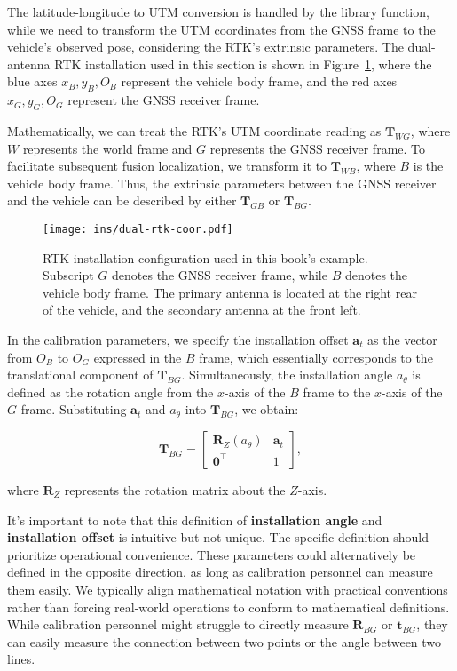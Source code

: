 The latitude-longitude to UTM conversion is handled by the library function, while we need to transform the UTM coordinates from the GNSS frame to the vehicle's observed pose, considering the RTK's extrinsic parameters. The dual-antenna RTK installation used in this section is shown in Figure~\ref{fig:dual-rtk-coor}, where the blue axes $x_B, y_B, O_B$ represent the vehicle body frame, and the red axes $x_G, y_G, O_G$ represent the GNSS receiver frame.

Mathematically, we can treat the RTK's UTM coordinate reading as $\mathbf{T}_{WG}$, where $W$ represents the world frame and $G$ represents the GNSS receiver frame. To facilitate subsequent fusion localization, we transform it to $\mathbf{T}_{WB}$, where $B$ is the vehicle body frame. Thus, the extrinsic parameters between the GNSS receiver and the vehicle can be described by either $\mathbf{T}_{GB}$ or $\mathbf{T}_{BG}$.

\begin{figure}
	\centering
	\texttt{[image: ins/dual-rtk-coor.pdf]}
	\caption{RTK installation configuration used in this book's example. Subscript $G$ denotes the GNSS receiver frame, while $B$ denotes the vehicle body frame. The primary antenna is located at the right rear of the vehicle, and the secondary antenna at the front left.}
	\label{fig:dual-rtk-coor}
\end{figure}

In the calibration parameters, we specify the installation offset $\mathbf{a}_t$ as the vector from $O_B$ to $O_G$ expressed in the $B$ frame, which essentially corresponds to the translational component of $\mathbf{T}_{BG}$. Simultaneously, the installation angle $a_{\theta}$ is defined as the rotation angle from the $x$-axis of the $B$ frame to the $x$-axis of the $G$ frame. Substituting $\mathbf{a}_t$ and $a_{\theta}$ into $\mathbf{T}_{BG}$, we obtain:

\begin{equation}\label{key}
	\mathbf{T}_{BG} = \begin{bmatrix}
		\mathbf{R}_Z (a_{\theta}) & \mathbf{a}_t \\
		\mathbf{0}^\top & 1
	\end{bmatrix},
\end{equation}

where $\mathbf{R}_Z$ represents the rotation matrix about the $Z$-axis.

It's important to note that this definition of \textbf{installation angle} and \textbf{installation offset} is intuitive but not unique. The specific definition should prioritize operational convenience. These parameters could alternatively be defined in the opposite direction, as long as calibration personnel can measure them easily. We typically align mathematical notation with practical conventions rather than forcing real-world operations to conform to mathematical definitions. While calibration personnel might struggle to directly measure $\mathbf{R}_{BG}$ or $\mathbf{t}_{BG}$, they can easily measure the connection between two points or the angle between two lines.

